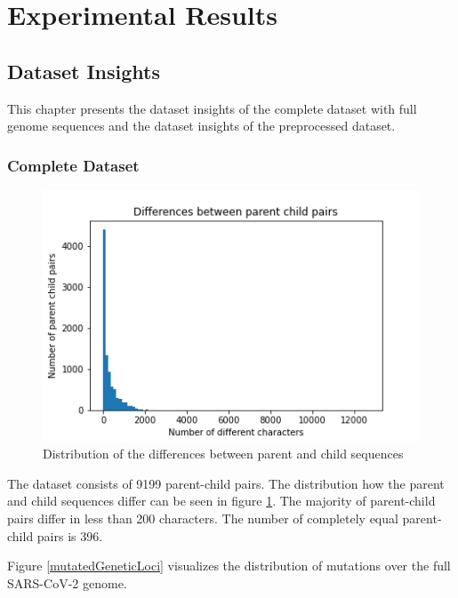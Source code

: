 \section{Experimental Results} \label{experiments}

\subsection{Dataset Insights} \label{experimentsA}

This chapter presents the dataset insights of the complete dataset with full genome sequences and the dataset insights of the preprocessed dataset.

\subsubsection{Complete Dataset} \label{experimentsAa}

\begin{figure}
	\centering
	\includegraphics[width=0.9\linewidth]{figures/distributionDifferencesParentChild.png}
	\caption{Distribution of the differences between parent and child sequences \cite{own representation}}
	\label{distributionDifferencesParentChild}
\end{figure}

The dataset consists of 9199 parent-child pairs.
The distribution how the parent and child sequences differ can be seen in figure \ref{distributionDifferencesParentChild}. The majority of parent-child pairs differ in less than 200 characters. The number of completely equal parent-child pairs is 396.

\vspace{2cm}
Figure \ref{mutatedGeneticLoci} visualizes the distribution of mutations over the full \ac{SARS-CoV-2} genome.


